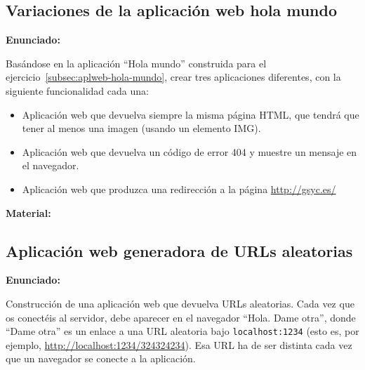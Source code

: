 \subsection{Variaciones de la aplicación web hola mundo}
\label{subsec:aplweb-hola-mundo-var}

\textbf{Enunciado:}

Basándose en la aplicación ``Hola mundo'' construida para el ejercicio~\ref{subsec:aplweb-hola-mundo}, crear tres aplicaciones diferentes, con la siguiente funcionalidad cada una:

\begin{itemize}
\item Aplicación web que devuelva siempre la misma página HTML, que tendrá que tener al menos una imagen (usando un elemento IMG).

\item Aplicación web que devuelva un código de error 404 y muestre un mensaje en el navegador.

\item Aplicación web que produzca una redirección a la página \url{http://gsyc.es/}
\end{itemize}

\textbf{Material:}



\subsection{Aplicación web generadora de URLs aleatorias}
\label{subsec:aplweb-urls-aleatorias}

\textbf{Enunciado:}

Construcción de una aplicación web que devuelva URLs aleatorias. Cada vez que os conectéis al servidor, debe aparecer en el navegador ``Hola. Dame otra'', donde ``Dame otra'' es un enlace a una URL aleatoria bajo \verb|localhost:1234| (esto es, por ejemplo, \url{http://localhost:1234/324324234}). Esa URL ha de ser distinta cada vez que un navegador se conecte a la aplicación.

